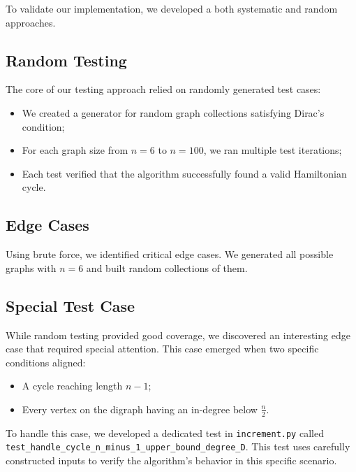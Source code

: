 To validate our implementation, we developed a both systematic and random approaches. 

\subsection{Random Testing}

The core of our testing approach relied on randomly generated test cases:

\begin{itemize}
    \item We created a generator for random graph collections satisfying Dirac's condition;
    \item For each graph size from $n=6$ to $n=100$, we ran multiple test iterations;
    \item Each test verified that the algorithm successfully found a valid Hamiltonian cycle.
\end{itemize}

\subsection{Edge Cases}

Using brute force, we identified critical edge cases. We generated all
possible graphs with $n = 6$ and built random collections of them.

\subsection{Special Test Case}

While random testing provided good coverage, we discovered an interesting edge case that required special attention. 
This case emerged when two specific conditions aligned:

\begin{itemize}
    \item A cycle reaching length $n-1$;
    \item Every vertex on the digraph having an in-degree below $\frac{n}{2}$.
\end{itemize}

To handle this case, we developed a dedicated test in \texttt{increment.py} called \texttt{test\_handle\_cycle\_n\_minus\_1\_upper\_bound\_degree\_D}. 
This test uses carefully constructed inputs to verify the algorithm's behavior in this specific scenario.